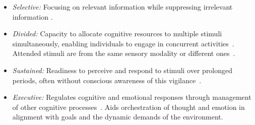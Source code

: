 
\begin{itemize}
    \itemsep0em
    \item \emph{Selective:} Focusing on relevant information while suppressing irrelevant information \cite{stevens2012role, murphy2016twenty}.
    
    \item \emph{Divided:} Capacity to allocate cognitive resources to multiple stimuli simultaneously, enabling individuals to engage in concurrent activities~\cite{spelke1976skills}. 
    Attended stimuli are from the same sensory modality or different ones~\cite{Herbranson2017}.

    \item \emph{Sustained:} Readiness to perceive and respond to stimuli over prolonged periods, often without conscious awareness of this vigilance~\cite{mackworth1948breakdown}.
    \item \emph{Executive:} Regulates cognitive and emotional responses through management of other cognitive processes~\cite{posner1990attention}. Aids orchestration of thought and emotion in alignment with goals and the dynamic demands of the environment.
\end{itemize}

